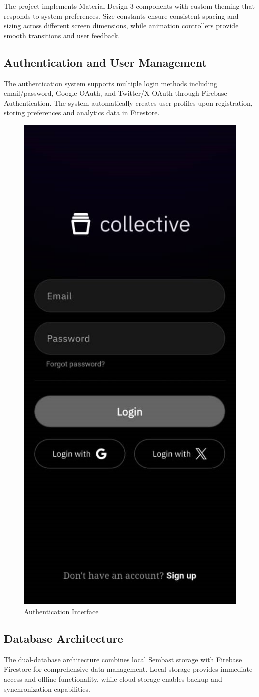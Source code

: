 \documentclass[conference]{IEEEtran}
\begin{document}
The project implements Material Design 3 components with custom theming that responds to system preferences. Size constants ensure consistent spacing and sizing across different screen dimensions, while animation controllers provide smooth transitions and user feedback.

\subsection{Authentication and User Management}

The authentication system supports multiple login methods including email/password, Google OAuth, and Twitter/X OAuth through Firebase Authentication. The system automatically creates user profiles upon registration, storing preferences and analytics data in Firestore.

\begin{figure}[H]
\centering
\includegraphics[width=0.4\columnwidth]{auth_login.jpeg}
\caption{Authentication Interface}
\label{fig:auth-interface}
\end{figure}

\subsection{Database Architecture}

The dual-database architecture combines local Sembast storage with Firebase Firestore for comprehensive data management. Local storage provides immediate access and offline functionality, while cloud storage enables backup and synchronization capabilities.
\end{document}
